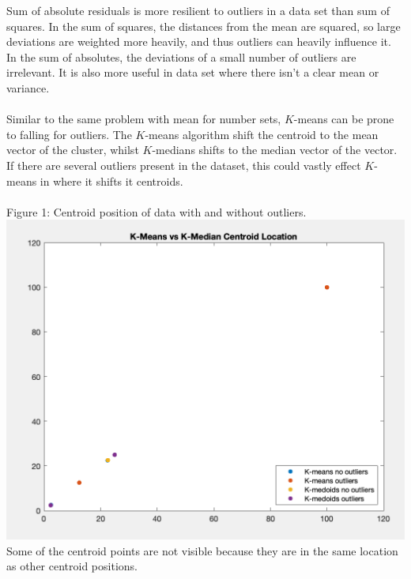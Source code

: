 \documentclass[11pt]{article}
\begin{document}
Sum of absolute residuals is more resilient to outliers in a data set than sum of squares. In the sum of squares, the distances from the mean are squared, so large deviations are weighted more heavily, and thus outliers can heavily influence it. In the sum of absolutes, the deviations of a small number of outliers are irrelevant. It is also more useful in data set where there isn't a clear mean or variance.\\\\

Similar to the same problem with mean for number sets, $K$-means can be prone to falling for outliers. The $K$-means algorithm shift the centroid to the mean vector of the cluster, whilst $K$-medians shifts to the median vector of the vector. If there are several outliers present in the dataset, this could vastly effect $K$-means in where it shifts it centroids.\\\\
Figure 1: Centroid position of data with and without outliers.\\
\includegraphics[scale=.6]{kmeans_vs_kmedians}\\
Some of the centroid points are not visible because they are in the same location as other centroid positions.\\\\
	
	
\end{document}
